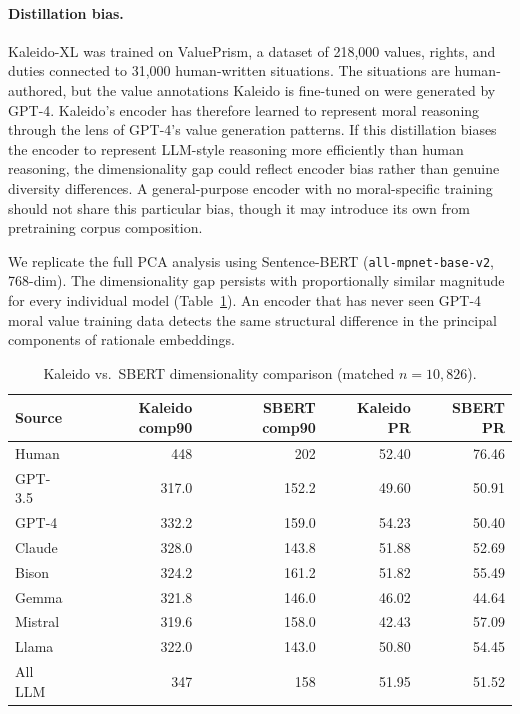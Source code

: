 \documentclass[11pt,a4paper]{article}
\begin{document}
\paragraph{Distillation bias.} Kaleido-XL was trained on ValuePrism, a dataset of 218,000 values, rights, and duties connected to 31,000 human-written situations. The situations are human-authored, but the value annotations Kaleido is fine-tuned on were generated by GPT-4. Kaleido's encoder has therefore learned to represent moral reasoning through the lens of GPT-4's value generation patterns. If this distillation biases the encoder to represent LLM-style reasoning more efficiently than human reasoning, the dimensionality gap could reflect encoder bias rather than genuine diversity differences. A general-purpose encoder with no moral-specific training should not share this particular bias, though it may introduce its own from pretraining corpus composition.

We replicate the full PCA analysis using Sentence-BERT (\texttt{all-mpnet-base-v2}, 768-dim). The dimensionality gap persists with proportionally similar magnitude for every individual model (Table~\ref{tab:kaleido_sbert}). An encoder that has never seen GPT-4 moral value training data detects the same structural difference in the principal components of rationale embeddings.

\begin{table}[H]
\centering
\caption{Kaleido vs.\ SBERT dimensionality comparison (matched $n = 10{,}826$).}
\label{tab:kaleido_sbert}
\begin{tabular}{lrrrr}
\toprule
Source & Kaleido comp90 & SBERT comp90 & Kaleido PR & SBERT PR \\
\midrule
Human   & 448   & 202   & 52.40 & 76.46 \\
GPT-3.5 & 317.0 & 152.2 & 49.60 & 50.91 \\
GPT-4   & 332.2 & 159.0 & 54.23 & 50.40 \\
Claude  & 328.0 & 143.8 & 51.88 & 52.69 \\
Bison   & 324.2 & 161.2 & 51.82 & 55.49 \\
Gemma   & 321.8 & 146.0 & 46.02 & 44.64 \\
Mistral & 319.6 & 158.0 & 42.43 & 57.09 \\
Llama   & 322.0 & 143.0 & 50.80 & 54.45 \\
\midrule
All LLM & 347   & 158   & 51.95 & 51.52 \\
\bottomrule
\end{tabular}
\end{table}
\end{document}
